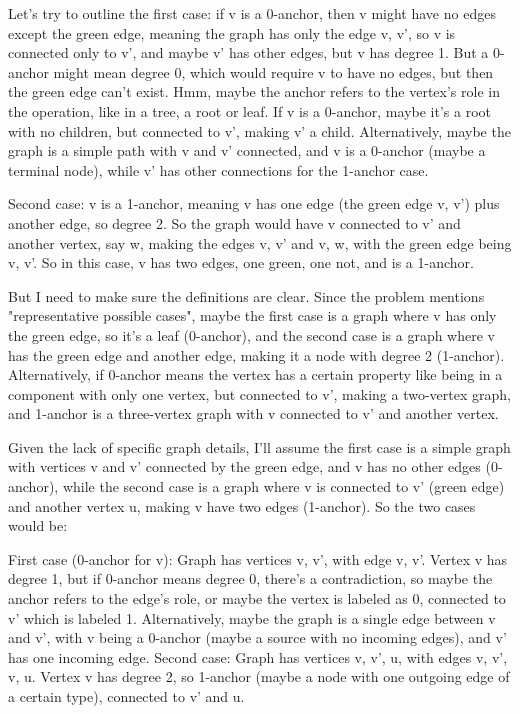 Let's try to outline the first case: if v is a 0-anchor, then v might have no edges except the green edge, meaning the graph has only the edge {v, v'}, so v is connected only to v', and maybe v' has other edges, but v has degree 1. But a 0-anchor might mean degree 0, which would require v to have no edges, but then the green edge can't exist. Hmm, maybe the anchor refers to the vertex's role in the operation, like in a tree, a root or leaf. If v is a 0-anchor, maybe it's a root with no children, but connected to v', making v' a child. Alternatively, maybe the graph is a simple path with v and v' connected, and v is a 0-anchor (maybe a terminal node), while v' has other connections for the 1-anchor case.

Second case: v is a 1-anchor, meaning v has one edge (the green edge {v, v'}) plus another edge, so degree 2. So the graph would have v connected to v' and another vertex, say w, making the edges {v, v'} and {v, w}, with the green edge being {v, v'}. So in this case, v has two edges, one green, one not, and is a 1-anchor.

But I need to make sure the definitions are clear. Since the problem mentions "representative possible cases", maybe the first case is a graph where v has only the green edge, so it's a leaf (0-anchor), and the second case is a graph where v has the green edge and another edge, making it a node with degree 2 (1-anchor). Alternatively, if 0-anchor means the vertex has a certain property like being in a component with only one vertex, but connected to v', making a two-vertex graph, and 1-anchor is a three-vertex graph with v connected to v' and another vertex.

Given the lack of specific graph details, I'll assume the first case is a simple graph with vertices v and v' connected by the green edge, and v has no other edges (0-anchor), while the second case is a graph where v is connected to v' (green edge) and another vertex u, making v have two edges (1-anchor). So the two cases would be:

First case (0-anchor for v): Graph has vertices v, v', with edge {v, v'}. Vertex v has degree 1, but if 0-anchor means degree 0, there's a contradiction, so maybe the anchor refers to the edge's role, or maybe the vertex is labeled as 0, connected to v' which is labeled 1. Alternatively, maybe the graph is a single edge between v and v', with v being a 0-anchor (maybe a source with no incoming edges), and v' has one incoming edge. Second case: Graph has vertices v, v', u, with edges {v, v'}, {v, u}. Vertex v has degree 2, so 1-anchor (maybe a node with one outgoing edge of a certain type), connected to v' and u.


